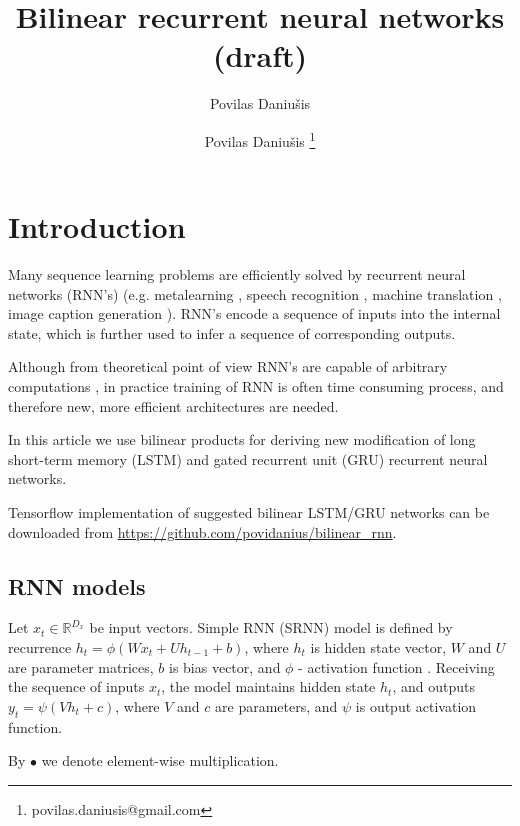 \documentclass[a4paper,11pt]{article}
\author{Povilas Daniu\v{s}is}
\author[1]{Povilas Daniu\v{s}is \thanks{povilas.daniusis@gmail.com}}
\title{Bilinear recurrent neural networks (draft)}
\begin{document}
\maketitle
\section{Introduction}

Many sequence learning problems are efficiently solved by recurrent neural networks (RNN's) (e.g. metalearning \cite{Andrychowicz}, speech recognition \cite{Sak}, machine translation \cite{Sutskever}, image caption generation \cite{Vinyals}). RNN's encode a sequence of inputs into the internal state, which is further used to infer a sequence of corresponding outputs. 

Although from theoretical point of view RNN's are capable of arbitrary computations \cite{Siegelmann}, in practice training of RNN is often time consuming process, and therefore new, more efficient architectures are needed.


In this article we use bilinear products for deriving new modification of long short-term memory (LSTM) \cite{Hochreiter} and gated recurrent unit (GRU) \cite{Chung} recurrent neural networks.


Tensorflow \cite{Tensorflow} implementation of suggested bilinear LSTM/GRU networks can be 
downloaded from \url{https://github.com/povidanius/bilinear_rnn}.




\subsection{RNN models}

Let $x_{t} \in \mathbb{R}^{D_{x}}$ be input vectors. Simple RNN (SRNN) model is defined by recurrence $h_{t} = \phi(Wx_{t} + Uh_{t-1} + b)$, where $h_{t}$ is hidden state vector, $W$ and $U$ are parameter matrices, $b$ is bias vector, and $\phi$ - activation function \cite{Elman}. Receiving the sequence of inputs $x_{t}$, the model maintains hidden state $h_{t}$, and outputs $y_{t} = \psi(Vh_{t} + c)$, where $V$ and $c$ are parameters, and $\psi$ is output activation function.

By $\bullet$ we denote element-wise multiplication. 
\end{document}
